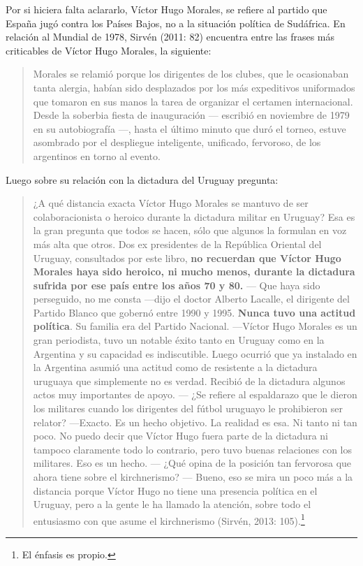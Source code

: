 Por si hiciera falta aclararlo, Víctor Hugo Morales, se refiere al partido que España jugó contra los Países Bajos, no a la situación política de Sudáfrica. En relación al Mundial de 1978, Sirvén (2011: 82) encuentra entre las frases más criticables de Víctor Hugo Morales, la siguiente:

\begin{quote}
Morales se relamió porque los dirigentes de los clubes, que le ocasionaban tanta alergia, habían sido desplazados por los más expeditivos uniformados que tomaron en sus manos la tarea de organizar el certamen internacional. Desde la soberbia fiesta de inauguración --- escribió en noviembre de 1979 en su autobiografía ---, hasta el último minuto que duró el torneo, estuve asombrado por el despliegue inteligente, unificado, fervoroso, de los argentinos en torno al evento.
\end{quote}

Luego sobre su relación con la dictadura del Uruguay pregunta:

\begin{quote}
¿A qué distancia exacta Víctor Hugo Morales se mantuvo de ser colaboracionista o heroico durante la dictadura militar en Uruguay? Esa es la gran pregunta que todos se hacen, sólo que algunos la formulan en voz más alta que otros. Dos ex presidentes de la República Oriental del Uruguay, consultados por este libro, \textbf{no recuerdan que Víctor Hugo Morales haya sido heroico, ni mucho menos, durante la dictadura sufrida por ese país entre los años 70 y 80.} --- Que haya sido perseguido, no me consta ---dijo el doctor Alberto Lacalle, el dirigente del Partido Blanco que gobernó entre 1990 y 1995. \textbf{Nunca tuvo una actitud política}. Su familia era del Partido Nacional. ---Víctor Hugo Morales es un gran periodista, tuvo un notable éxito tanto en Uruguay como en la Argentina y su capacidad es indiscutible. Luego ocurrió que ya instalado en la Argentina asumió una actitud como de resistente a la dictadura uruguaya que simplemente no es verdad. Recibió de la dictadura algunos actos muy importantes de apoyo. --- ¿Se refiere al espaldarazo que le dieron los militares cuando los dirigentes del fútbol uruguayo le prohibieron ser relator? ---Exacto. Es un hecho objetivo. La realidad es esa. Ni tanto ni tan poco. No puedo decir que Víctor Hugo fuera parte de la dictadura ni tampoco claramente todo lo contrario, pero tuvo buenas relaciones con los militares. Eso es un hecho. --- ¿Qué opina de la posición tan fervorosa que ahora tiene sobre el kirchnerismo? --- Bueno, eso se mira un poco más a la distancia porque Víctor Hugo no tiene una presencia política en el Uruguay, pero a la gente le ha llamado la atención, sobre todo el entusiasmo con que asume el kirchnerismo (Sirvén, 2013: 105).\footnote{El énfasis es propio.}
\end{quote}

